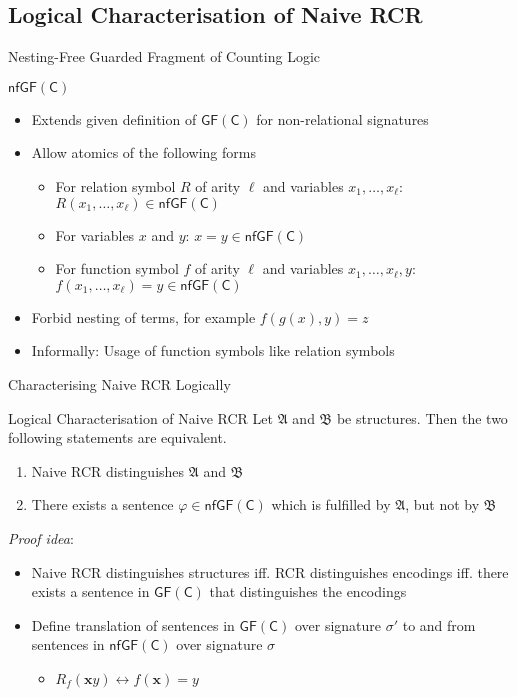 \documentclass[aspectratio=169]{beamer}
\newcommand{\GFC}{\mathsf{GF}(\mathsf{C})}
\renewcommand{\phi}{\varphi}
\begin{document}
	\subsection{Logical Characterisation of Naive RCR}
	
	\begin{frame}{Nesting-Free Guarded Fragment of Counting Logic}
		\begin{block}{$\mathsf{nfGF}(\mathsf C)$}
			\begin{itemize}
				\item Extends given definition of $\GFC$ for non-relational signatures
				\item Allow atomics of the following forms
				\begin{itemize}
					\item For relation symbol $R$ of arity $\ell$ and variables $x_1,\dots,x_\ell$: $R(x_1,\dots,x_\ell)\in \mathsf{nfGF}(\mathsf C)$
					\item For variables $x$ and $y$: $x=y\in \mathsf{nfGF}(\mathsf C)$
					\item For function symbol $f$ of arity $\ell$ and variables $x_1,\dots,x_\ell,y$: $f(x_1,\dots,x_\ell)=y\in \mathsf{nfGF}(\mathsf C)$
				\end{itemize}
			\end{itemize}
		\end{block}
		\begin{itemize}
			\item Forbid nesting of terms, for example $f(g(x),y)=z$
			\item Informally: Usage of function symbols like relation symbols
		\end{itemize}
	\end{frame}
	
	\begin{frame}{Characterising Naive RCR Logically}
		\begin{block}{Logical Characterisation of Naive RCR}
			Let $\mathfrak A$ and $\mathfrak B$ be structures.
			Then the two following statements are equivalent.
			\begin{enumerate}
				\item Naive RCR distinguishes $\mathfrak A$ and $\mathfrak B$
				\item There exists a sentence $\phi\in\mathsf{nfGF}(\mathsf C)$ which is fulfilled by $\mathfrak A$, but not by $\mathfrak B$
			\end{enumerate}
		\end{block}
		\emph{Proof idea}:
		\begin{itemize}
			\item Naive RCR distinguishes structures iff. RCR distinguishes encodings iff. there exists a sentence in $\GFC$ that distinguishes the encodings
			\item Define translation of sentences in $\GFC$ over signature $\sigma'$ to and from sentences in $\mathsf{nfGF}(\mathsf C)$ over signature $\sigma$
			\begin{itemize}
				\item $R_f(\mathbf xy) \leftrightarrow f(\mathbf x)=y$
			\end{itemize}
		\end{itemize}
	\end{frame}
	
\end{document}
